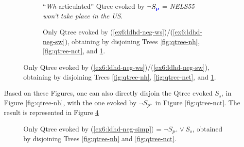 \begin{figure}[H]
	\begin{subfigure}[b]{.45\linewidth}
		\centering		{}
		\caption{``\textit{Wh}-articulated'' Qtree evoked by $\neg S_{\textbf{\textcolor{blue}{p}}}$ = \textit{NELS55 won't take place in the US}.}\label{fig:qtree-nus}
	\end{subfigure}
	\hfill
	\begin{subfigure}[b]{.45\linewidth}
		\centering		{}
		\caption{Only Qtree evoked by (\ref{ex6:ldhd-neg-ws})/(\ref{ex6:ldhd-neg-sw}), obtaining by disjoining Trees \ref{fig:qtree-nh}, \ref{fig:qtree-nct}, and \ref{fig:qtree-nus}.}\label{fig:qtree-nctv(nusvnh)}
	\end{subfigure}
\end{figure}


Based on these Figures, one can also directly disjoin the Qtree evoked $S_s$, in Figure \ref{fig:qtree-nh}, with the one evoked by $\neg S_{p^+}$ in Figure \ref{fig:qtree-nct}. The result is represented in Figure \ref{fig:qtree-nctvnh}

\begin{figure}[H]
	\centering		{}
	\caption[]{Only Qtree evoked by (\ref{ex6:ldhd-neg-simp}) = $\neg S_{p^+} \vee S_s$, obtained by disjoining Trees \ref{fig:qtree-nh} and \ref{fig:qtree-nct}.}\label{fig:qtree-nctvnh}
\end{figure}

